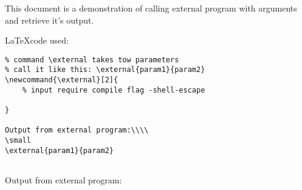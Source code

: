 \documentclass[12pt]{article}
\begin{document}
This document is a demonstration of calling external program with arguments and retrieve it's output.

\LaTeX code used:
\small\small
\begin{verbatim}
% command \external takes tow parameters
% call it like this: \external{param1}{param2}
\newcommand{\external}[2]{
    % input require compile flag -shell-escape
    
}

Output from external program:\\\\
\small
\external{param1}{param2}
    
\end{verbatim}

\newcommand{\external}[2]{
    
}

Output from external program:\\\\
\small
\external{param1}{param2}
\end{document}
